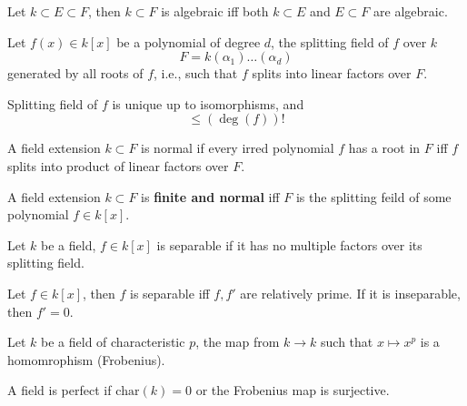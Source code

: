 \documentclass[openany]{book}
\begin{document}
\begin{cor}
    Let $k\subset E\subset F$, then $k\subset F$ is algebraic iff both $k\subset E$ and $E\subset F$ are algebraic.
\end{cor}


\begin{defn}
    Let $f(x)\in k[x]$ be a polynomial of degree $d$, the splitting field of $f$ over $k$ 
    \begin{equation*}
        F=k(\alpha_1)\dots(\alpha_d)
    \end{equation*}
    generated by all roots of $f$, i.e., such that $f$ splits into linear factors over $F$.
\end{defn}

\begin{prop}
    Splitting field of $f$ is unique up to isomorphisms, and 
    \begin{equation*}
        [F:k]\leq(\deg(f))!
    \end{equation*}
\end{prop}


\begin{defn}
    A field extension $k\subset F$ is normal if every irred polynomial $f$ has a root in $F$ iff $f$ splits into product of linear factors over $F$.
\end{defn}

\begin{prop}[normal]
    A field extension $k\subset F$ is \textbf{finite and normal} iff $F$ is the splitting feild of some polynomial $f\in k[x]$.
\end{prop}



\begin{defn}
    Let $k$ be a field, $f\in k[x]$ is separable if it has no multiple factors over its splitting field.
\end{defn}

\begin{prop}
    Let $f\in k[x]$, then $f$ is separable iff $f, f'$ are relatively prime. If it is inseparable, then $f'=0$.
\end{prop}



\begin{defn}
    Let $k$ be a field of characteristic $p$, the map from $k\to k$ such that $x\mapsto x^p$ is a homomrophism (Frobenius).

    A field is perfect if $\text{char}(k)=0$ or the Frobenius map is surjective.
\end{defn}
\end{document}
